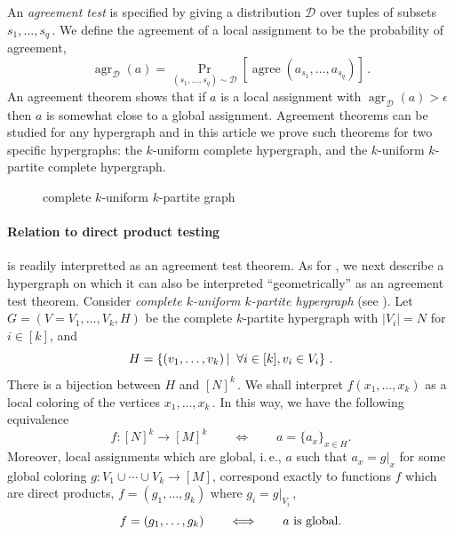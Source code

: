 \documentclass[11pt]{article}
\numberwithin{equation}{section}
\theoremstyle{definition}
\theoremstyle{plain}
\newcommand{\ie}{i.\,e.}
\newcommand{\Prob}[2][]{\Pr_{{#1}}\left[#2\right]} %
\newcommand{\abs}[1]{\lvert#1\rvert} %
\newcommand\sett[2]{\left\{ #1 \left| \; \vphantom{#1 #2} \right. #2  \right\}} %
\newcommand{\set}[1]{\{#1\}} %
\DeclareMathOperator*{\agree}{agree} %
\DeclareMathOperator*{\agrx}{agr} %
\begin{document}
An \emph{agreement test} is specified by giving a distribution $\mathcal{D}$ over tuples of subsets $s_1,\ldots,s_q$\,. We define the agreement of a local assignment to be the probability of agreement,
\[ \agrx_\mathcal{D}(a) = \Prob[(s_1,\ldots,s_q)\sim \mathcal{D}]{ \agree(a_{s_1},\ldots, a_{s_q}) }\,. %
\]
%
An agreement theorem shows that if $a$ is a local assignment with $\agrx_\mathcal{D}(a) > \epsilon$ then $a$ is somewhat close to a global assignment. Agreement theorems can be studied for any hypergraph and in this
%
article  %
we prove such theorems for two specific hypergraphs: the $k$-uniform complete hypergraph, and the $k$-uniform $k$-partite complete hypergraph.
{
	\begin{figure}
		\caption{complete $k$-uniform $k$-partite graph}
		\label{fig:partite}
		\centering
	\end{figure}}
	
\paragraph*{Relation to direct product testing}
 is readily interpretted as an agreement test theorem. As for , we next describe a hypergraph on which it can also be interpreted ``geometrically'' as an agreement test theorem. Consider \emph{complete $k$-uniform $k$-partite hypergraph} (see ).
Let $G = (V=V_1,\ldots, V_k, H)$ be the complete $k$-partite hypergraph with $\abs{V_i}=N$ for $i\in[k]$, and
\[ H = \sett{(v_1,\ldots, v_k)}{\forall i\in [k], v_i\in V_i}\,. \] %
There is a bijection between $H$ and $[N]^k$\,. We shall interpret $f(x_1,\ldots,x_k)$ as a local coloring of the vertices $x_1,\ldots,x_k$\,. In this way, we have the following equivalence
\[ f:[N]^k\to[M]^k \qquad \Longleftrightarrow \qquad a = \set{a_x}_{x\in H}.
\]
Moreover, local assignments which are global, \ie, $a$ such that $a_x = g|_x$ for some global coloring  $g:V_1\cup\cdots\cup V_k\to[M]$, correspond exactly to functions $f$ which are direct products, $f=(g_1,\ldots,g_k)$ where $g_i = g|_{V_i}$\,,
\[ f=(g_1,\ldots,g_k) \qquad \Longleftrightarrow \qquad a \hbox{ is global}. %
\]
	
\end{document}
